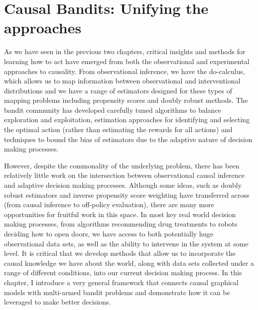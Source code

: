 \documentclass[11pt,a4paper,twoside]{report}
\theoremstyle{plain}
\theoremstyle{definition}
\begin{document}
\chapter{Causal Bandits: Unifying the approaches}
\label{chap:causal-bandit}

As we have seen in the previous two chapters, critical insights and methods for learning how to act have emerged from both the observational and experimental approaches to causality. From observational inference, we have the do-calculus, which allows us to map information between observational and interventional distributions and we have a range of estimators designed for these types of mapping problems including propensity scores and doubly robust methods. The bandit community has developed carefully tuned algorithms to balance exploration and exploitation, estimation approaches for identifying and selecting the optimal action (rather than estimating the rewards for all actions) and techniques to bound the bias of estimators due to the adaptive nature of decision making processes.

However, despite the commonality of the underlying problem, there has been relatively little work on the intersection between observational causal inference and adaptive decision making processes. Although some ideas, such as doubly robust estimators and inverse propensity score weighting have transferred across (from causal inference to off-policy evaluation), there are many more opportunities for fruitful work in this space. In most key real world decision making processes, from algorithms recommending drug treatments to robots deciding how to open doors, we have access to both potentially huge observational data sets, as well as the ability to intervene in the system at some level. It is critical that we develop methods that allow us to incorporate the causal knowledge we have about the world, along with data sets collected under a range of different conditions, into our current decision making process. In this chapter, I introduce a very general framework that connects causal graphical models with multi-armed bandit problems and demonstrate how it can be leveraged to make better decisions.
\end{document}
